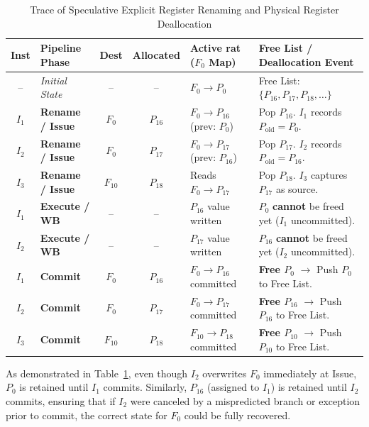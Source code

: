 \begin{table}[htpb]
\centering
\footnotesize
\setlength{\tabcolsep}{3pt}
\begin{tabularx}{\textwidth}{c l c c >{\raggedright\arraybackslash}X >{\raggedright\arraybackslash}X}
\hline
\textbf{Inst} & \textbf{Pipeline Phase} & \textbf{Dest} & \textbf{Allocated} & \textbf{Active \gls{rat} ($F_0$ Map)} & \textbf{Free List / Deallocation Event} \\ \hline
-- & \textit{Initial State} & -- & -- & $F_0 \to P_0$ & Free List: $\{P_{16}, P_{17}, P_{18}, \dots\}$ \\
$I_1$ & \textbf{Rename / Issue} & $F_0$ & $P_{16}$ & $F_0 \to P_{16}$ (prev: $P_0$) & Pop $P_{16}$. $I_1$ records $P_{\text{old}} = P_0$. \\
$I_2$ & \textbf{Rename / Issue} & $F_0$ & $P_{17}$ & $F_0 \to P_{17}$ (prev: $P_{16}$) & Pop $P_{17}$. $I_2$ records $P_{\text{old}} = P_{16}$. \\
$I_3$ & \textbf{Rename / Issue} & $F_{10}$ & $P_{18}$ & Reads $F_0 \to P_{17}$ & Pop $P_{18}$. $I_3$ captures $P_{17}$ as source. \\ \hline
$I_1$ & \textbf{Execute / WB} & -- & -- & $P_{16}$ value written & $P_0$ \textbf{cannot} be freed yet ($I_1$ uncommitted). \\
$I_2$ & \textbf{Execute / WB} & -- & -- & $P_{17}$ value written & $P_{16}$ \textbf{cannot} be freed yet ($I_2$ uncommitted). \\ \hline
$I_1$ & \textbf{Commit} & $F_0$ & $P_{16}$ & $F_0 \to P_{16}$ committed & \textbf{Free $P_0$} $\to$ Push $P_0$ to Free List. \\
$I_2$ & \textbf{Commit} & $F_0$ & $P_{17}$ & $F_0 \to P_{17}$ committed & \textbf{Free $P_{16}$} $\to$ Push $P_{16}$ to Free List. \\
$I_3$ & \textbf{Commit} & $F_{10}$ & $P_{18}$ & $F_{10} \to P_{18}$ committed & \textbf{Free $P_{10}$} $\to$ Push $P_{10}$ to Free List. \\ \hline
\end{tabularx}
\caption{Trace of Speculative Explicit Register Renaming and Physical Register Deallocation}
\label{tab:explicit_renaming_trace}
\end{table}

As demonstrated in Table~\ref{tab:explicit_renaming_trace}, even though $I_2$ overwrites $F_0$ immediately at Issue, $P_0$ is retained until $I_1$ commits. Similarly, $P_{16}$ (assigned to $I_1$) is retained until $I_2$ commits, ensuring that if $I_2$ were canceled by a mispredicted branch or exception prior to commit, the correct state for $F_0$ could be fully recovered.

